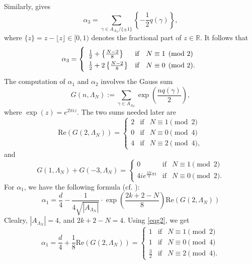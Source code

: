\documentclass[11pt]{amsart}
\numberwithin{equation}{subsection}
\theoremstyle{plain}
\theoremstyle{remark}
\theoremstyle{definition}
\newcommand{\bR}{\mathbb{R}}
\begin{document}
Similarly, \cite[p. 55]{bruinier} gives
%
$$\alpha_3=\sum_{\gamma\in A_{\Lambda_N}/\{\pm1\}}\left\{-\frac{1}{2}q(\gamma)\right\},$$
%
where $\{z\}=z-\lfloor z\rfloor\in[0,1)$ denotes the fractional part of $z\in\bR$. It follows that
%
\begin{equation}\label{computea3}
\alpha_3=\left\{ 
\renewcommand*{\arraystretch}{1.4}
\begin{array}{lcl}\frac{1}{2}+\left\{\frac{N-2}{8}\right\}&\textrm{if}& N\equiv 1 \pmod 2\\
\frac{1}{2}+2\left\{\frac{N-2}{8}\right\}&\textrm{if}& N\equiv 0 \pmod 2.
  \end{array}\right. 
  \end{equation}
%
The computation of  $\alpha_1$ and $\alpha_2$ involves the Gauss sum
% 
$$G(n,\Lambda_N):=\sum_{\gamma\in A_{\Lambda_N}} \exp\left(\frac{nq(\gamma)}{2}\right),$$
%
where $\exp(z)=e^{2\pi i z}$. The two sums needed later are 
%
\begin{equation}\label{eqg2}
%
\mathrm{Re}\left( G(2,\Lambda_N)\right)=\left\{\begin{matrix}2&\textrm{if}& N\equiv 1 \pmod 2\\
0&\textrm{if}& N\equiv 0 \pmod 4\\
4&\textrm{if}& N\equiv 2 \pmod 4,
\end{matrix}\right.
\end{equation}
and 
\begin{equation}\label{eqg13}
G(1,\Lambda_N)+G(-3,\Lambda_N)=\left\{\begin{matrix} 0 &\textrm{if}& N\equiv 1 \pmod 2\\
 4i e^{\frac{3N}{4} \pi i}&\textrm{if}& N\equiv 0 \pmod 2.
 \end{matrix}
 \right.
 \end{equation}
%
For $\alpha_1$, we have the following formula (cf. \cite[Eq. (12)]{bruinier}):
%
$$\alpha_1=\frac{d}{4}-\frac{1}{4\sqrt{|A_{\Lambda_N}|}}\cdot \exp\left(\frac{2k+2-N}{8}\right)\mathrm{Re}\left(G(2,\Lambda_N)\right)$$
%
Clealry, $|A_{\Lambda_N}|=4$,  and $2k+2-N=4$. Using \eqref{eqg2}, we get
%
\begin{equation}\label{computea1}
\alpha_1=\frac{d}{4}+\frac{1}{8}\mathrm{Re}(G(2,\Lambda_N))=\left\{
\begin{matrix}
1&\textrm{if}&N\equiv 1 \pmod 2\\
1&\textrm{if}&N\equiv 0 \pmod 4\\
\frac{3}{2}&\textrm{if}&N\equiv 2 \pmod 4.
\end{matrix}
\right. 
\end{equation}
\end{document}
